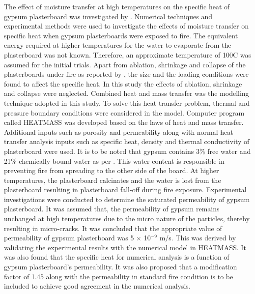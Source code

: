 The effect of moisture transfer at high temperatures on the specific heat of gypsum plasterboard was investigated by \citet{Ang2009}. Numerical techniques and experimental methods were used to investigate the effects of moisture transfer on specific heat when gypsum plasterboards were exposed to fire. The equivalent energy required at higher temperatures for the water to evaporate from the plasterboard was not known. Therefore, an approximate temperature of 100\degree C was assumed for the initial trials. Apart from ablation, shrinkage and collapse of the plasterboards under fire as reported by \citet{Jones2001}, the size and the loading conditions were found to affect the specific heat. In this study the effects of ablation, shrinkage and collapse were neglected. Combined heat and mass transfer was the modelling technique adopted in this study. To solve this heat transfer problem, thermal and pressure boundary conditions were considered in the model. Computer program called HEATMASS was developed based on the laws of heat and mass transfer. Additional inputs such as porosity and permeability along with normal heat transfer analysis inputs such as specific heat, density and thermal conductivity of plasterboard were used. It is to be noted that gypsum contains 3\% free water and 21\% chemically bound water as per \citet{Mehaffey1994}. This water content is responsible in preventing fire from spreading to the other side of the board. At higher temperatures, the plasterboard calcinates and the water is lost from the plasterboard resulting in plasterboard fall-off during fire exposure. Experimental investigations were conducted to determine the saturated permeability of gypsum plasterboard. It was assumed that, the permeability of gypsum remains unchanged at high temperatures due to the micro nature of the particles, thereby resulting in micro-cracks. It was concluded that the appropriate value of permeability of gypsum plasterboard was 5 $\times$ 10$^{-9}$ m/s. This was derived by validating the experimental results with the numerical model in HEATMASS. It was also found that the specific heat for numerical analysis is a function of gypsum plasterboard's permeability. It was also proposed that a modification factor of 1.45 along with the permeability in standard fire condition is to be included to achieve good agreement in the numerical analysis. 

